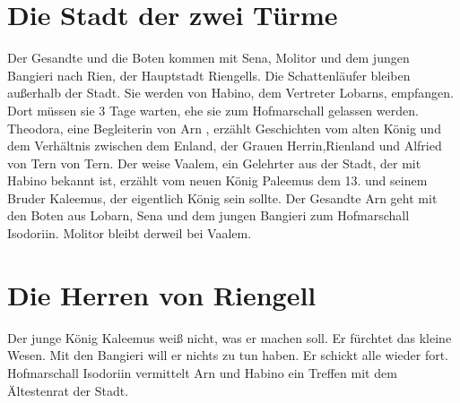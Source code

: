 \documentclass[12pt,a4paper,onecolumn,twoside,ngerman]{book}
\newcommand{\Tern}{Tern}
\newcommand{\Molitor}{Molitor}
\newcommand{\Sena}{Sena}
\newcommand{\Bangiri}{Bangieri}
\newcommand{\Arwed}{Alfried von \Tern}
\newcommand{\Enland}{Enland}
\newcommand{\Schattenlaufer}{Schattenläufer}
\newcommand{\Lobarn}{Lobarn}
\newcommand{\Arn}{Arn}
\newcommand{\Theodora}{Theodora}
\newcommand{\Rhinland}{Rienland}
\newcommand{\Rhingell}{Riengell}
\newcommand{\Rhin}{Rien}
\newcommand{\Habino}{Habino}
\newcommand{\Valem}{Vaalem}
\newcommand{\Palemus}{Paleemus}
\newcommand{\Kalemus}{Kaleemus}
\newcommand{\Isodoriin}{Isodoriin}
\begin{document}
{\section{Die Stadt der zwei Türme}
Der Gesandte und die Boten kommen mit {\Sena}, {\Molitor} und  dem jungen {\Bangiri} nach {\Rhin}, der Hauptstadt \Rhingell{s}. Die  {\Schattenlaufer} bleiben außerhalb der Stadt.\linebreak
Sie werden von {\Habino}, dem Vertreter {\Lobarn}s, empfangen. Dort müssen sie 3 Tage warten, ehe sie zum Hofmarschall gelassen werden. {\Theodora}, eine Begleiterin von {\Arn} , erzählt Geschichten vom alten König und dem Verhältnis zwischen dem {\Enland}, der Grauen Herrin,{\Rhinland} und {\Arwed} von {\Tern}.\linebreak 
Der weise {\Valem}, ein Gelehrter aus der Stadt, der mit {\Habino} bekannt ist, erzählt vom neuen König {\Palemus} dem 13. und seinem Bruder {\Kalemus}, der eigentlich König sein sollte. Der Gesandte {\Arn} geht mit den Boten aus {\Lobarn}, {\Sena} und dem jungen {\Bangiri} zum Hofmarschall {\Isodoriin}.\linebreak
{\Molitor} bleibt derweil bei {\Valem}.

\section{Die Herren von \Rhingell}
Der junge König {\Kalemus} weiß nicht, was er machen soll. Er fürchtet das kleine Wesen. Mit den {\Bangiri} will er nichts zu tun haben. Er schickt alle wieder fort.\linebreak
Hofmarschall {\Isodoriin} vermittelt {\Arn} und {\Habino} ein Treffen mit dem Ältestenrat der Stadt.

}
\end{document}
